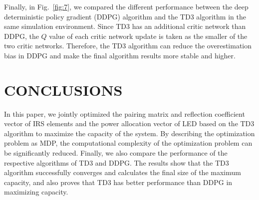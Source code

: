 \documentclass[conference]{IEEEtran}
\begin{document}
Finally, in Fig.~\ref{fig:7}, we compared the  different performance between the 
deep deterministic policy gradient (DDPG) algorithm 
and the TD3 algorithm in the same simulation environment. Since TD3 has an 
additional critic network than DDPG, the $Q$ value of each critic network update 
is taken as the smaller of the two critic networks. Therefore, the TD3 algorithm 
can reduce the overestimation bias in DDPG and make the final algorithm results 
more stable and higher.
\section{CONCLUSIONS}
In this paper, we jointly optimized the pairing matrix and reflection coefficient 
vector of IRS elements and the power allocation vector of LED based on the TD3 
algorithm to maximize the capacity of the system. By describing the optimization 
problem as MDP, the computational complexity of the optimization problem 
can be significantly reduced. Finally, we also compare the performance of the 
respective algorithms of TD3 and DDPG. The results show that the TD3 algorithm 
successfully converges and calculates the final size of the maximum capacity, 
and also proves that TD3 has better performance than DDPG in maximizing capacity.
\end{document}
